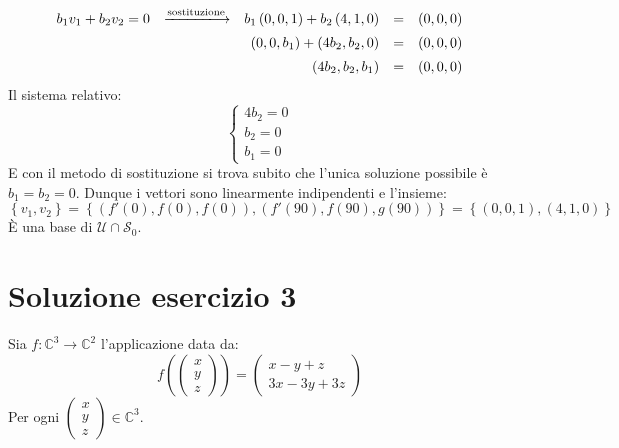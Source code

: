 \documentclass[a4paper]{article}
\begin{document}
	\begin{equation*}
		\begin{array}{llrll}
			b_{1}v_{1} + b_{2}v_{2} = 0 & \xlongrightarrow{\text{sostituzione}} & b_{1}\left(0,0,1\right) + b_{2}\left(4,1,0\right) &=& \left(0, 0, 0\right) \\ [0.5em]
			&& \left(0,0,b_{1}\right) + \left(4b_{2}, b_{2}, 0\right) &=& \left(0,0,0\right) \\ [0.5em]
			&& \left(4b_{2}, b_{2}, b_{1}\right) &=& \left(0,0,0\right)
		\end{array}
	\end{equation*}
	Il sistema relativo:
	\begin{equation*}
		\begin{cases}
			4b_{2} = 0 \\
			b_{2} = 0 \\
			b_{1} = 0
		\end{cases}
	\end{equation*}
	E con il metodo di sostituzione si trova subito che l'unica soluzione possibile è $b_{1} = b_{2} = 0$. Dunque i vettori sono linearmente indipendenti e l'insieme:
	\begin{equation*}
		\left\{v_{1}, v_{2}\right\} = \left\{ \left(f'\left(0\right), f\left(0\right), f\left(0\right)\right), \left(f'\left(90\right), f\left(90\right), g\left(90\right)\right) \right\} = \left\{ \left(0,0,1\right), \left(4,1,0\right)\right\}
	\end{equation*}
	È una base di $\mathscr{U} \cap \mathscr{S}_{0}$.\newpage
	
	\section{Soluzione esercizio 3}
	
	Sia $f: \mathbb{C}^{3} \rightarrow \mathbb{C}^{2}$ l'applicazione data da:
	\begin{equation*}
		f \left(
		\begin{pmatrix}
			 x \\ y \\ z
		\end{pmatrix}
		\right) = \begin{pmatrix}
			x-y+z \\
			3x-3y+3z
		\end{pmatrix}
	\end{equation*}
	Per ogni $\begin{pmatrix}
		x \\ y \\ z
	\end{pmatrix} \in \mathbb{C}^{3}$.
\end{document}
